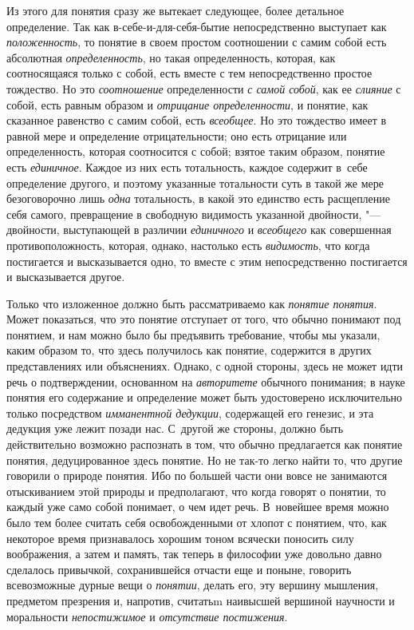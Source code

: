 Из этого для понятия сразу же вытекает следующее, более детальное
определение. Так как в-себе-и-для-себя-бытие непосредственно выступает как
{\em положенность}, то понятие в своем простом соотношении с самим собой есть
абсолютная {\em определенность}, но такая определенность, которая, как
соотносящаяся только с собой, есть вместе с тем непосредственно простое
тождество. Но это {\em соотношение} определенности {\em с самой собой}, как
ее {\em слияние} с собой, есть равным образом и {\em отрицание определенности},
и понятие, как сказанное равенство с самим собой, есть {\em всеобщее}.
Но это тождество имеет в равной мере и определение отрицательности; оно есть
отрицание или определенность, которая соотносится с собой; взятое таким
образом, понятие есть {\em единичное}. Каждое из них есть тотальность, каждое
содержит в~себе определение другого, и поэтому указанные тотальности суть в
такой же мере безоговорочно лишь {\em одна} тотальность, в какой это
единство есть расщепление себя самого, превращение в свободную видимость
указанной двойности, "--- двойности, выступающей в различии {\em единичного}
и {\em всеобщего} как совершенная противоположность, которая, однако, настолько
есть {\em видимость}, что когда постигается и высказывается одно, то вместе
с этим непосредственно постигается и высказывается другое.

Только что изложенное должно быть рассматриваемо как {\em понятие понятия}.
Может показаться, что это понятие отступает от того, что обычно понимают под
понятием, и нам можно было бы предъявить требование, чтобы мы указали, каким
образом то, что здесь получилось как понятие, содержится в других
представлениях или объяснениях. Однако, с одной стороны, здесь не может идти
речь о подтверждении, основанном на {\em авторитете} обычного понимания; в
науке понятия его содержание и определение может быть удостоверено
исключительно только посредством {\em имманентной дедукции}, содержащей его
генезис, и эта дедукция уже лежит позади нас. С~другой же стороны, должно
быть действительно возможно распознать в том, что обычно предлагается как
понятие понятия, дедуцированное здесь понятие. Но не так-то легко найти то,
что другие говорили о природе понятия. Ибо по большей части они вовсе не
занимаются отыскиванием этой природы и предполагают, что когда говорят о
понятии, то каждый уже само собой понимает, о чем идет речь. В~новейшее
время можно было тем более считать себя освобожденными от хлопот с понятием,
что, как некоторое время признавалось хорошим тоном всячески поносить силу
воображения, а затем и память, так теперь в философии уже довольно давно
сделалось привычкой, сохранившейся отчасти еще и поныне, говорить
всевозможные дурные вещи о {\em понятии}, делать его, эту вершину мышления,
предметом презрения и, напротив, считатьm наивысшей вершиной научности и
моральности {\em непостижимое} и {\em отсутствие постижения}.

